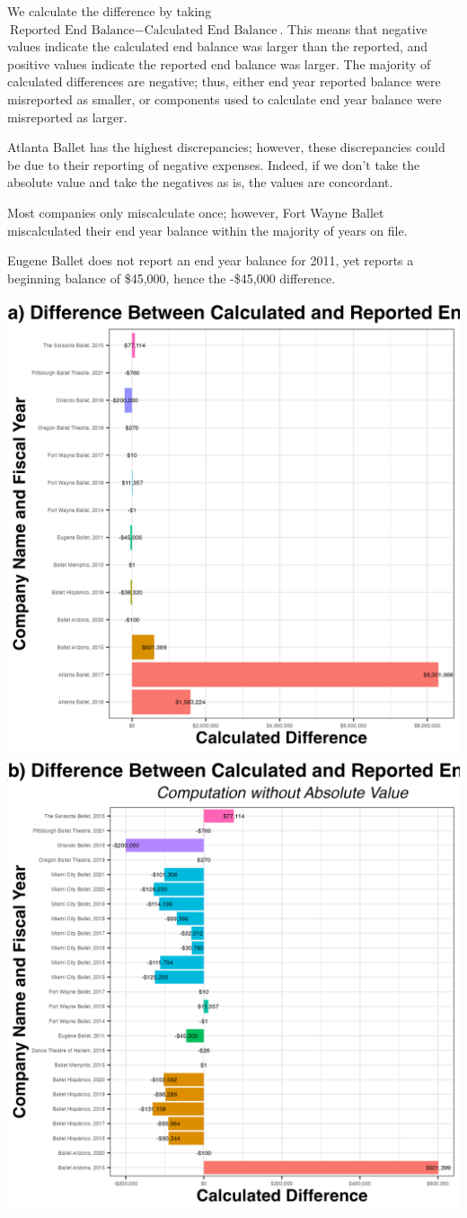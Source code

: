 \documentclass[Dance Data
Project,article,submit,moreauthors,pdftex]{mdpi}
\begin{document}
We calculate the difference by taking
\(\text{Reported End Balance} - \text{Calculated End Balance}\). This
means that negative values indicate the calculated end balance was
larger than the reported, and positive values indicate the reported end
balance was larger. The majority of calculated differences are negative;
thus, either end year reported balance were misreported as smaller, or
components used to calculate end year balance were misreported as
larger.

Atlanta Ballet has the highest discrepancies; however, these
discrepancies could be due to their reporting of negative expenses.
Indeed, if we don't take the absolute value and take the negatives as
is, the values are concordant.

Most companies only miscalculate once; however, Fort Wayne Ballet
miscalculated their end year balance within the majority of years on
file.

Eugene Ballet does not report an end year balance for 2011, yet reports
a beginning balance of \$45,000, hence the -\$45,000 difference.

\includegraphics[width=0.5\linewidth,]{../images/diff_end_bal}
\includegraphics[width=0.5\linewidth,]{../images/diff_end_bal_no_abs}
\end{document}
